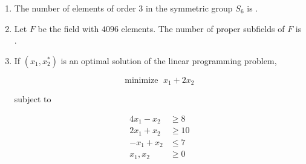 \documentclass[journal,12pt,onecolumn]{IEEEtran}
\theoremstyle{remark}
\begin{document}
\begin{enumerate}[start=1, label=Q.\arabic*]
\begin{enumerate}
\end{enumerate}
\hfill{}
\item The number of elements of order $3$ in the symmetric group $S_6$ is \underline{\hspace{2cm}}.

\begin{enumerate}
\end{enumerate}

\hfill{}

\item Let $F$ be the field with $4096$ elements. The number of proper subfields of $F$ is \underline{\hspace{2cm}}.

\begin{enumerate}
\end{enumerate}

\hfill{}

\item If $(x_1, x_2^*)$ is an optimal solution of the linear programming problem,

\[
\text{minimize } \; x_1 + 2x_2
\]

subject to  

\[
\begin{aligned}
4x_1 - x_2 &\geq 8 \\
2x_1 + x_2 &\geq 10 \\
-x_1 + x_2 &\leq 7 \\
x_1, x_2 &\geq 0
\end{aligned}
\]


\end{enumerate}
\end{document}
